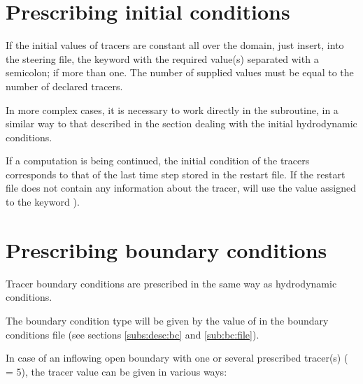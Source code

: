 \section{Prescribing initial conditions}

If the initial values of tracers are constant all over the domain, just insert,
into the steering file, the keyword  with the
required value(s) separated with a semicolon; if more than one.
The number of supplied values must be equal to the number of declared tracers.

In more complex cases, it is necessary to work directly in the
 subroutine, in a similar way to that described
in the section dealing with the initial hydrodynamic conditions.

If a computation is being continued, the initial condition of the tracers
corresponds to that of the last time step stored in the restart file.
If the restart file does not contain any information about the tracer,
 will use the value assigned to the keyword
).

\section{Prescribing boundary conditions}
\label{sec:tr:prescr:bc}
Tracer boundary conditions are prescribed in the same way as hydrodynamic
conditions.

The boundary condition type will be given by the value of 
in the boundary conditions file (see sections \ref{subs:desc:bc} and
\ref{sub:bc:file}).

In case of an inflowing open boundary with one or several prescribed tracer(s)
( = 5), the tracer value can be given in various ways:


